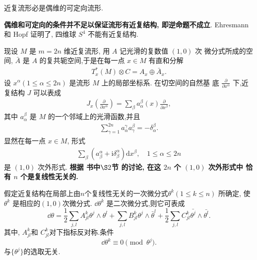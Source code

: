 \begin{theorem}
近复流形必是偶维的可定向流形.
\end{theorem}
\begin{remark}
    \textbf{偶维和可定向的条件并不足以保证流形有近复结构, 即逆命题不成立}. Ehresmann 和 Hopf 证明了, 四维球 $S^4$ 不能有近复结构.
\end{remark}
\begin{key}
    现设 $M$ 是 $m=2 n$ 维近复流形, 用 $A$ 记光滑的复数值 $(1,0)$ 次 微分式所成的空间, $\bar{A}$ 是 $A$ 的复共轭空间,于是在每一点 $x \in M$ 有直和分解
\begin{align}
T_x^*(M) \otimes C=A_x \oplus \bar{A}_x .
\end{align}
设 $x^\alpha(1 \leqslant \alpha \leqslant 2 n)$ 是流形 $M$ 上的局部坐标系. 在切空间的自然基 底 $\frac{\partial}{\partial x^\alpha}$ 下,近复结构 $J$ 可以表成
\begin{align}
J_x\left(\frac{\partial}{\partial x^\alpha}\right)=\sum_\beta a_\alpha^\beta(x) \frac{\partial}{\partial x^\beta},
\end{align}
其中 $a_\alpha^\beta$ 是 $M$ 的一个邻域上的光滑函数,并且
\begin{align}
\sum_{\gamma=1}^{2 n} a_\alpha^\gamma a_\gamma^\beta=-\delta_\alpha^\beta .
\end{align}
显然在每一点 $x \in M$, 形式
\begin{align}
\sum_\beta\left(a_\beta^\alpha+\mathrm{i} \delta_\beta^\alpha\right) \mathrm{d} x^\beta, \quad 1 \leqslant \alpha \leqslant 2 n
\end{align}
是 $(1,0)$ 次外形式. \textbf{根据 书中$\S 2$节 的讨论, 在这 $2 n$ 个 $(1,0)$ 次外形式中 恰有 $n$ 个是复线性无关的.}
\end{key}
假定近复结构在局部上由$n$个复线性无关的一次微分式$\theta^k (1\leqslant k\leqslant n)$ 所确定, 使$\theta^k$ 是相应的$(1,0)$次微分式. $\dd \theta^k$ 是二次微分式,则它可表成
\[\dd\theta=\frac{1}{2}\sum_{j,l}A_{jl}^k \theta^j\wedge \theta^l+\sum_{j,l}B_{jl}^k \theta^j\wedge \bar{\theta}^l+\frac{1}{2}\sum_{j,l}C_{jl}^k \bar{\theta^j}\wedge \bar{\theta^l}.\]
其中, $A_{jl}^k$和 $C^k_{jl}$对下指标反对称.条件 
\begin{equation}
    \dd \theta^k\equiv 0 \pmod{\theta^j}.
    \label{eq:3.12}
\end{equation}
与$\{\theta^j\}$的选取无关.

